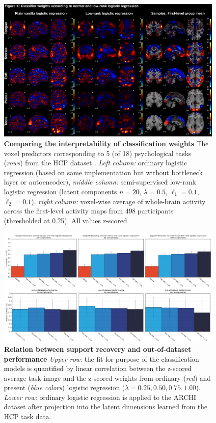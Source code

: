 \documentclass{article} %
\begin{document}
\begin{figure}
\begin{centering}
\includegraphics[width=1.00\textwidth]{figures/figure_weights.jpg}
\end{centering}
\caption{\textbf{Comparing the interpretability of classification weights}
The voxel predictors corresponding to 5 (of 18) psychological tasks (\textit{rows})
from the HCP dataset \cite{barch2013}.
\textit{Left column:} ordinary logistic regression (based on same
implementation but without bottleneck layer or autoencoder),
\textit{middle column:} semi-supervised low-rank logistic regression
(latent components $n=20$, $\lambda=0.5$, $\ell_1=0.1$, $\ell_2=0.1$),
\textit{right column:} voxel-wise average of whole-brain activity
across the first-level activity maps from 498 participants
(thresholded at 0.25).
All values z-scored.
}
\end{figure}

\begin{figure}
\begin{centering}
\includegraphics[width=1.00\textwidth]{figures/support_bars.png}
\end{centering}
\caption{\textbf{Relation between support recovery and out-of-dataset performance}
\textit{Upper row:} the fit-for-purpose of the classification models
is quantified by linear correlation between the
z-scored average task image and the z-scored weights from
ordinary (\textit{red}) and present (\textit{blue colors}) logistic
regression ($\lambda=0.25, 0.50, 0.75, 1.00$).
\textit{Lower row:} ordinary logistic regression is applied to the
ARCHI dataset after projection into the latent dimensions learned from
the HCP task data.
}
\end{figure}
\end{document}
